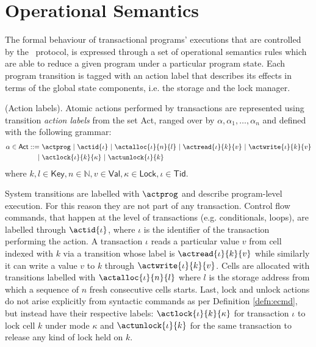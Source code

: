 \section{Operational Semantics}

\label{sec:2plSemantics}

The formal behaviour of transactional programs' executions that are controlled by the \tpl\ protocol, is expressed through a set of operational semantics rules which are able to reduce a given program under a particular program state. Each program transition is tagged with an action label that describes its effects in terms of the global state components, i.e. the storage and the lock manager.

\begin{defn}
	(Action labels).
	Atomic actions performed by transactions are represented using transition \emph{action labels} from the set \textsf{Act}, ranged over by $\alpha, \alpha_1, \ldots, \alpha_n$ and defined with the following grammar:
	\begin{align*}
		\alpha \in \mathsf{Act} ::=
		\ &\actprog\
		|\ \actid{\iota}\
		|\ \actalloc{\iota}{n}{l}\
		|\ \actread{\iota}{k}{v}\
		|\ \actwrite{\iota}{k}{v}\\
		|\ &\actlock{\iota}{k}{\kappa}\
		|\ \actunlock{\iota}{k}
	\end{align*}
	where $k, l \in \mathsf{Key}, n \in \mathds{N}, v \in \mathsf{Val}, \kappa \in \mathsf{Lock}, \iota \in \mathsf{Tid}$.
\end{defn}

System transitions are labelled with $\actprog$ and describe program-level execution. For this reason they are not part of any transaction. Control flow commands, that happen at the level of transactions (e.g. conditionals, loops), are labelled through $\actid{\iota}$, where $\iota$ is the identifier of the transaction performing the action. A transaction $\iota$ reads a particular value $v$ from cell indexed with $k$ via a transition whose label is $\actread{\iota}{k}{v}$ while similarly it can write a value $v$ to $k$ through $\actwrite{\iota}{k}{v}$. Cells are allocated with transitions labelled with $\actalloc{\iota}{n}{l}$ where $l$ is the storage address from which a sequence of $n$ fresh consecutive cells starts. Last, lock and unlock actions do not arise explicitly from syntactic commands as per Definition \ref{defn:ecmd}, but instead have their respective labels: $\actlock{\iota}{k}{\kappa}$ for transaction $\iota$ to lock cell $k$ under mode $\kappa$ and $\actunlock{\iota}{k}$ for the same transaction to release any kind of lock held on $k$.


